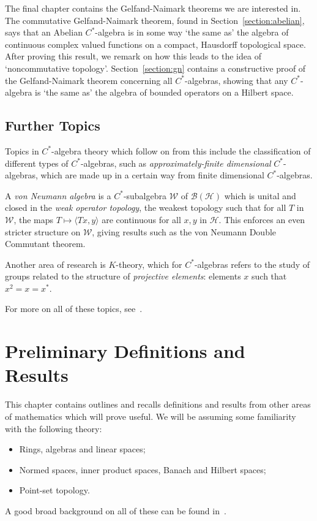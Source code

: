 \documentclass[11pt,a4paper]{report}
\theoremstyle{plain}
\theoremstyle{definition}
\newcommand{\1}{\mathbbm{1}}
\renewcommand{\H}{\mathcal{H}}
\newcommand{\W}{\mathcal{W}}
\newcommand{\B}{\mathcal{B}}
\newcommand{\BH}{\mathcal{\B(\H)}}
\begin{document}
The final chapter contains the Gelfand-Naimark theorems we are interested in.
The commutative Gelfand-Naimark theorem, found in Section~\ref{section:abelian},
says that an Abelian $C^\ast$-algebra is in some way `the same as' the algebra 
of continuous complex valued functions on a compact, Hausdorff topological 
space. After proving this result, we remark on how this leads to the idea of
`noncommutative topology'. Section~\ref{section:gn} contains a constructive 
proof of the Gelfand-Naimark theorem concerning all $C^\ast$-algebras, showing 
that any $C^\ast$-algebra is `the same as' the algebra of bounded operators on a Hilbert 
space.


\section{Further Topics}
Topics in $C^\ast$-algebra theory which follow on from this include the 
classification of different types of $C^\ast$-algebras, such as 
\emph{approximately-finite dimensional} $C^\ast$-algebras, which are made up in 
a certain way from finite dimensional $C^\ast$-algebras.

A \emph{von Neumann algebra }is a $C^\ast$-subalgebra $\W$ of $\BH$ which is 
unital and closed in the \emph{weak operator topology}, the weakest topology 
such that for all $T$ in $\W$, the maps $T\mapsto\langle Tx,y\rangle$ are 
continuous for all $x,y$ in $\H$. This enforces an even stricter structure on 
$\W$, giving results such as the von Neumann Double Commutant theorem.

Another area of research is $K$-theory, which for $C^\ast$-algebras refers to 
the study of groups related to the structure of \emph{projective elements}:
elements $x$ such that $x^2 = x = x^\ast$.

For more on all of these topics, see~\cite{dixmier81,sakai71,davidson96}.



\chapter{Preliminary Definitions and Results} 
This chapter contains outlines and recalls definitions and results from other 
areas of mathematics which will prove useful.
We will be assuming some familiarity with the following theory:
\begin{itemize}
	\item Rings, algebras and linear spaces;
	\item Normed spaces, inner product spaces, Banach and Hilbert spaces;
	\item Point-set topology.
\end{itemize}
A good broad background on all of these can be found in~\cite{rudin91,simmons83}.
\end{document}

